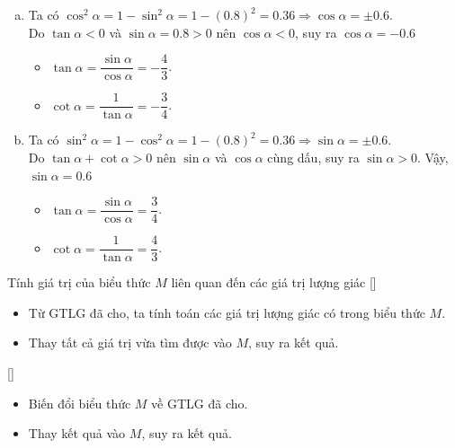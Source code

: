 \begin{vd}
{\begin{enumerate}[a)]
			\item Ta có $\cos^2 \alpha=1-\sin^2\alpha = 1-(0.8)^2=0.36 \Rightarrow \cos \alpha = \pm 0.6$.\\
			Do $\tan \alpha <0$ và $\sin \alpha=0.8>0$ nên $\cos \alpha <0$, suy ra $\cos \alpha = - 0.6$
			\begin{itemize}
				\item  $\tan \alpha = \dfrac{\sin \alpha}{\cos \alpha}=-\dfrac{4}{3}$.
				\item  $\cot \alpha = \dfrac{1}{\tan \alpha}=-\dfrac{3}{4}$.
			\end{itemize} 
			
			\item Ta có $\sin^2 \alpha=1-\cos^2\alpha = 1-(0.8)^2=0.36 \Rightarrow \sin \alpha = \pm 0.6$.\\
			Do $\tan \alpha +\cot \alpha >0$ nên $\sin \alpha$ và $\cos \alpha$ cùng dấu, suy ra $\sin \alpha >0$. Vậy, $\sin \alpha = 0.6$
			\begin{itemize}
				\item  $\tan \alpha = \dfrac{\sin \alpha}{\cos \alpha}=\dfrac{3}{4}$.
				\item  $\cot \alpha = \dfrac{1}{\tan \alpha}=\dfrac{4}{3}$.
			\end{itemize} 
	\end{enumerate}}
\end{vd} %

\begin{dang}{Tính giá trị của biểu thức $M$ liên quan đến các giá trị lượng giác}
	[\iconMT] 
		\begin{itemize}
			\item  Từ GTLG đã cho, ta tính toán các giá trị lượng giác có trong biểu thức $M$.
			\item  Thay tất cả giá trị vừa tìm được vào $M$, suy ra kết quả.
		\end{itemize}
		 [\iconMT] 
		\begin{itemize}
			\item  Biến đổi biểu thức $M$ về GTLG đã cho.
			\item  Thay kết quả vào $M$, suy ra kết quả.
		\end{itemize}
\end{dang}

